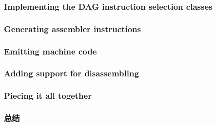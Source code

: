 \documentclass[11pt,a4paper,UTF8]{ctexart}
\begin{document}
		\subsubsection{Implementing the DAG instruction selection classes}
		\subsubsection{Generating assembler instructions}
		\subsubsection{Emitting machine code}
		\subsubsection{Adding support for disassembling}
		\subsubsection{Piecing it all together}
		\subsubsection{总结}
\end{document}
